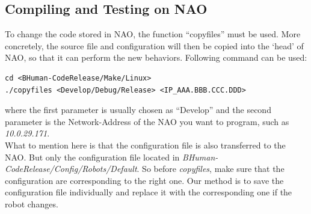 \subsection{Compiling and Testing on NAO}
To change the code stored in NAO, the function ``copyfiles'' must be used. More concretely, the source file and configuration will then be copied into the `head' of NAO, so that it can perform the new behaviors. Following command can be used:
\begin{lstlisting}
cd <BHuman-CodeRelease/Make/Linux>
./copyfiles <Develop/Debug/Release> <IP_AAA.BBB.CCC.DDD>
\end{lstlisting}
where the first parameter is usually chosen as ``Develop'' and the second parameter is the Network-Address of the NAO you want to program, such as \textit{10.0.29.171}.\\
What to mention here is that the configuration file is also transferred to the NAO. But only the configuration file located in \textit{BHuman-CodeRelease/Config/Robots/Default}. So before \textit{copyfiles}, make sure that the configuration are corresponding to the right one. Our method is to save the configuration file individually and replace it with the corresponding one if the robot changes. 
